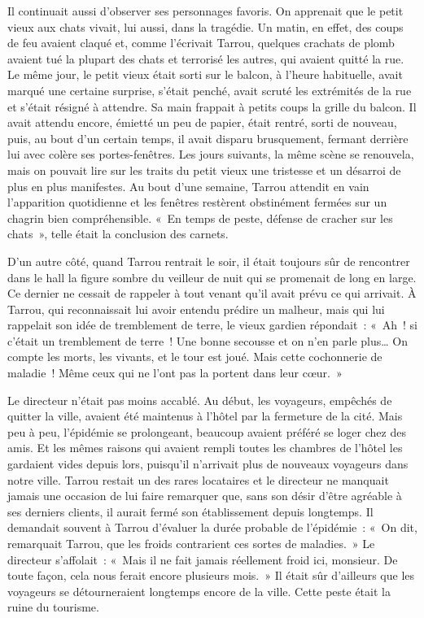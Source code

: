 \documentclass[french,twoside]{book} %
\begin{document}
Il continuait aussi d’observer ses personnages favoris. On apprenait que le petit vieux aux chats vivait, lui aussi, dans la tragédie. Un matin, en effet, des coups de feu avaient claqué et, comme l’écrivait Tarrou, quelques crachats de plomb avaient tué la plupart des chats et terrorisé les autres, qui avaient quitté la rue. Le même jour, le petit vieux était sorti sur le balcon, à l’heure habituelle, avait marqué une certaine surprise, s’était penché, avait scruté les extrémités de la rue et s’était résigné à attendre. Sa main frappait à petits coups la grille du balcon. Il avait attendu encore, émietté un peu de papier, était rentré, sorti de nouveau, puis, au bout d’un certain temps, il avait disparu brusquement, fermant derrière lui avec colère ses portes-fenêtres. Les jours suivants, la même scène se renouvela, mais on pouvait lire sur les traits du petit vieux une tristesse et un désarroi de plus en plus manifestes. Au bout d’une semaine, Tarrou attendit en vain l’apparition quotidienne et les fenêtres restèrent obstinément fermées sur un chagrin bien compréhensible. « En temps de peste, défense de cracher sur les chats », telle était la conclusion des carnets.\par
D’un autre côté, quand Tarrou rentrait le soir, il était toujours sûr de rencontrer dans le hall la figure sombre du veilleur de nuit qui se promenait de long en large. Ce dernier ne cessait de rappeler à tout venant qu’il avait prévu ce qui arrivait. À Tarrou, qui reconnaissait lui avoir entendu prédire un malheur, mais qui lui rappelait son idée de tremblement de terre, le vieux gardien répondait : « Ah ! si c’était un tremblement de terre ! Une bonne secousse et on n’en parle plus… On compte les morts, les vivants, et le tour est joué. Mais cette cochonnerie de maladie ! Même ceux qui ne l’ont pas la portent dans leur cœur. »\par
Le directeur n’était pas moins accablé. Au début, les voyageurs, empêchés de quitter la ville, avaient été maintenus à l’hôtel par la fermeture de la cité. Mais peu à peu, l’épidémie se prolongeant, beaucoup avaient préféré se loger chez des amis. Et les mêmes raisons qui avaient rempli toutes les chambres de l’hôtel les gardaient vides depuis lors, puisqu’il n’arrivait plus de nouveaux voyageurs dans notre ville. Tarrou restait un des rares locataires et le directeur ne manquait jamais une occasion de lui faire remarquer que, sans son désir d’être agréable à ses derniers clients, il aurait fermé son établissement depuis longtemps. Il demandait souvent à Tarrou d’évaluer la durée probable de l’épidémie : « On dit, remarquait Tarrou, que les froids contrarient ces sortes de maladies. » Le directeur s’affolait : « Mais il ne fait jamais réellement froid ici, monsieur. De toute façon, cela nous ferait encore plusieurs mois. » Il était sûr d’ailleurs que les voyageurs se détourneraient longtemps encore de la ville. Cette peste était la ruine du tourisme.\par
\end{document}
